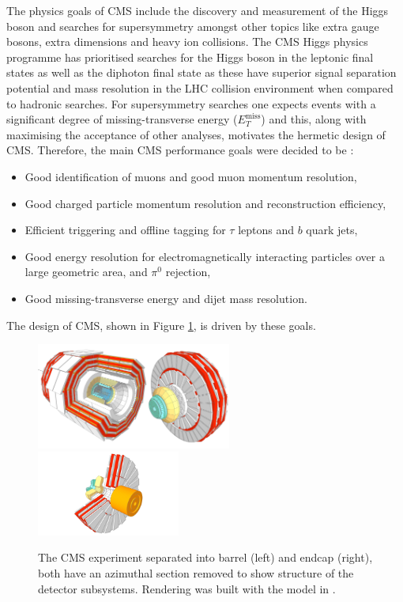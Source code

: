 The physics goals of CMS include the discovery and measurement of the Higgs boson and searches for supersymmetry amongst other topics like extra gauge bosons, extra dimensions and heavy ion collisions. 
The CMS Higgs physics programme has prioritised searches for the Higgs boson in the leptonic final states as well as the diphoton final state as these have superior signal separation potential and mass resolution in the LHC collision environment when compared to hadronic searches. For supersymmetry searches one expects events with a significant degree of missing-transverse energy ($E_{T}^{\mathrm{miss}}$) and this, along with maximising the acceptance of other analyses, motivates the hermetic design of CMS. Therefore, the main CMS performance goals were decided to be \cite{CMSatLHC}:
\begin{itemize}[noitemsep]%
    \item Good identification of muons and good muon momentum resolution,
    \item Good charged particle momentum resolution and reconstruction efficiency,
    \item Efficient triggering and offline tagging for $\tau$ leptons and $b$ quark jets, 
    \item Good energy resolution for electromagnetically interacting particles over a large geometric area, and $\pi^{0}$ rejection,
    \item Good missing-transverse energy and dijet mass resolution.
\end{itemize}
The design of CMS, shown in Figure \ref{fig:apparatus:CMS}, is driven by these goals. 
\begin{figure}[h!]
    \begin{center}
        \includegraphics[width=0.57\textwidth]{figures/apparatus/CMS.pdf}
        \includegraphics[width=0.42\textwidth]{figures/apparatus/ENDCAP2.pdf}
    \end{center}    
    \caption{The CMS experiment separated into barrel (left) and endcap (right), both have an azimuthal section removed to show structure of the detector subsystems. Rendering was built with the model in \cite{SketchupCMS}.}
    \label{fig:apparatus:CMS}
\end{figure}



